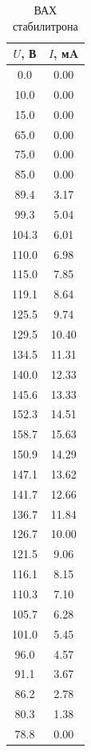 \documentclass[a4paper,14pt]{article}
\begin{document}
	\begin{table}[bhtp]
		\begin{center}
		\begin{tabular}{|c|c|}
			\hline
			$U$, В & $I$, мA \\ \hline
			0.0    & 0.00    \\ \hline
			10.0   & 0.00    \\ \hline
			15.0   & 0.00    \\ \hline
			65.0   & 0.00    \\ \hline
			75.0   & 0.00    \\ \hline
			85.0   & 0.00    \\ \hline
			89.4   & 3.17    \\ \hline
			99.3   & 5.04    \\ \hline
			104.3  & 6.01    \\ \hline
			110.0  & 6.98    \\ \hline
			115.0  & 7.85    \\ \hline
			119.1  & 8.64    \\ \hline
			125.5  & 9.74    \\ \hline
			129.5  & 10.40   \\ \hline
			134.5  & 11.31   \\ \hline
			140.0  & 12.33   \\ \hline
			145.6  & 13.33   \\ \hline
			152.3  & 14.51   \\ \hline
			158.7  & 15.63   \\ \hline
			150.9  & 14.29   \\ \hline
			147.1  & 13.62   \\ \hline
			141.7  & 12.66   \\ \hline
			136.7  & 11.84   \\ \hline
			126.7  & 10.00   \\ \hline
			121.5  & 9.06    \\ \hline
			116.1  & 8.15    \\ \hline
			110.3  & 7.10    \\ \hline
			105.7  & 6.28    \\ \hline
			101.0  & 5.45    \\ \hline
			96.0   & 4.57    \\ \hline
			91.1   & 3.67    \\ \hline
			86.2   & 2.78    \\ \hline
			80.3   & 1.38    \\ \hline
			78.8   & 0.00    \\ \hline
		\end{tabular}
		\caption{ВАХ стабилитрона}\label{tab1}
		\end{center}
	\end{table}
\end{document}
